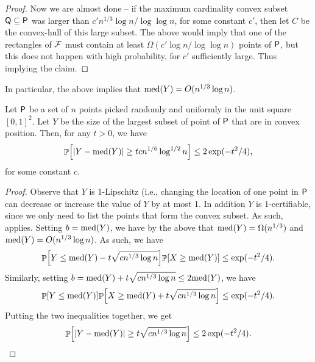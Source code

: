 \begin{proof}
    Now we are almost done -- if the maximum cardinality convex subset
    ${{\mathsf{Q}}} \subseteq {\mathsf{P}}$ was larger than
    $c'n^{1/3} \log n / \log \log n$, for some constant $c'$, then let
    $C$ be the convex-hull of this large subset. The above would imply
    that one of the rectangles of $\mathcal{F}$ must contain at least
    $\Omega(c' \log n / \log \log n)$ points of ${\mathsf{P}}$, but this
    does not happen with high probability, for $c'$ sufficiently
    large. Thus implying the claim.
\end{proof}

In particular, the above implies that $\medX{Y} = O(n^{1/3} \log n)$.

\begin{theorem}
    Let ${\mathsf{P}}$ be a set of $n$ points picked randomly and uniformly
    in the unit square $[0,1]^2$. Let $Y$ be the size of the largest
    subset of point of ${\mathsf{P}}$ that are in convex position. Then,
    for any $t>0$, we have
    \begin{equation*}
        \Prob{ \cardin{Y - \medX{Y} } \geq  t c n^{1/6} \log^{1/2} n} 
        \leq
        2\exp(-t^2/4),
    \end{equation*}
    for some constant $c$.
\end{theorem}
\begin{proof}
    Observe that $Y$ is $1$-Lipschitz (i.e., changing the location of
    one point in ${\mathsf{P}}$ can decrease or increase the value of $Y$
    by at most $1$. In addition $Y$ is $1$-certifiable, since we only
    need to list the points that form the convex subset. As such,
     applies. Setting $b=\medX{Y}$, we
    have by the above that $\medX{Y} =\Omega(n^{1/3})$ and
    $\medX{Y} = O(n^{1/3} \log n)$. As such, we have
    \begin{equation*}
        \Prob{ Y \leq \medX{Y}- t\sqrt{c n^{1/3} \log n}}%
        \!\Prob{X \geq \medX{Y}} \leq \exp(-t^2/4).
    \end{equation*}
    Similarly, setting $b = \medX{Y} + t \sqrt{c n^{1/3} \log n} \leq
    2 \medX{Y}$, we have
    \begin{equation*}
        \Prob{ Y \leq \medX{Y}}%
        \!\Prob{X \geq \medX{Y} + t \sqrt{c n^{1/3} \log n} } \leq \exp(-t^2/4).
    \end{equation*}
    Putting the two inequalities together, we get
    \begin{equation*}
        \Prob{ \cardin{Y - \medX{Y}} \geq  t \sqrt{c n^{1/3} \log n} }
        \leq
        2\exp(-t^2/4).
    \end{equation*}   
\end{proof}

